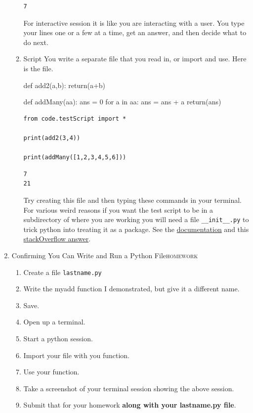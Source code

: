 \documentclass{article}
\begin{document}
\begin{enumerate}
\begin{enumerate}
\begin{verbatim}
7
\end{verbatim}


For interactive session it is like you are interacting with a user. You type your lines one or a few at a time, get an answer, and then decide what to do next. 
\item Script
\label{sec:org23c5c19}
You write a separate file that you read in, or import and use. Here is the file.

def add2(a,b):
    return(a+b)

def addMany(aa):
    ans = 0
    for a in aa:
        ans = ans + a
    return(ans)

\begin{verbatim}
from code.testScript import *

print(add2(3,4))

print(addMany([1,2,3,4,5,6]))
\end{verbatim}

\begin{verbatim}
7
21
\end{verbatim}


Try creating this file and then typing these commands in your terminal. For various weird reasons if you want the test script to be in a subdirectory of where you are working you will need a file \texttt{\_\_init\_\_.py} to trick python into treating it as a package. See the \href{https://docs.python.org/3/tutorial/modules.html\#packages}{documentation} and this \href{https://stackoverflow.com/questions/1260792/import-a-file-from-a-subdirectory}{stackOverflow answer}.
\end{enumerate}
\item Confirming You Can Write and Run a Python File\hfill{}\textsc{homework}
\label{sec:orgeee20ca}
\begin{enumerate}
\item Create a file \texttt{lastname.py}
\item Write the myadd function I demonstrated, but give it a different name.
\item Save.
\item Open up a terminal.
\item Start a python session.
\item Import your file with you function.
\item Use your function.
\item Take a screenshot of your terminal session showing the above session.
\item Submit that for your homework \textbf{along with your lastname.py file}.
\end{enumerate}
\end{enumerate}
\end{document}
